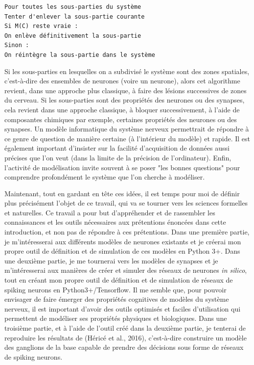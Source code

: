 \documentclass[12pt]{scrartcl}
\begin{document}
\begin{enumerate}
\begin{verbatim}
Pour toutes les sous-parties du système 
Tenter d'enlever la sous-partie courante 
Si M(C) reste vraie : 
On enlève définitivement la sous-partie 
Sinon : 
On réintègre la sous-partie dans le système
\end{verbatim}
Si les sous-parties en lesquelles on a subdivisé le système sont des zones spatiales, c'est-à-dire des ensembles de neurones (voire un neurone), alors cet algorithme revient, dans une approche plus classique, à faire des lésions successives de zones du cerveau. Si les sous-parties sont des propriétés des neurones ou des synapses, cela revient dans une approche classique, à bloquer successivement, à l'aide de composantes chimiques par exemple, certaines propriétés des neurones ou des synapses. 
Un modèle informatique du système nerveux permettrait de répondre à ce genre de question de manière certaine (à l'intérieur du modèle) et rapide. Il est également important d'insister sur la facilité d'acquisition de données aussi précises que l'on veut (dans la limite de la précision de l'ordinateur). Enfin, l'activité de modélisation invite souvent à se poser "les bonnes questions" pour comprendre profondément le système que l'on cherche à modéliser. \\ \end{enumerate}

Maintenant, tout en gardant en tête ces idées, il est temps pour moi de définir plus précisément l'objet de ce travail, qui va se tourner vers les sciences formelles et naturelles. Ce travail a pour but d'appréhender et de rassembler les connaissances et les outils nécessaires aux prétentions énoncées dans cette introduction, et non pas de répondre à ces prétentions. 
Dans une première partie, je m'intéresserai aux différents modèles de neurones existants et je créerai mon propre outil de définition et de simulation de ces modèles en Python 3+. Dans une deuxième partie, je me tournerai vers les modèles de synapses et je m'intéresserai aux manières de créer et simuler des réseaux de neurones \textit{in silico}, tout en créant mon propre outil de définition et de simulation de réseaux de spiking neurons en Python3+/Tensorflow. Il me semble que, pour pouvoir envisager de faire émerger des propriétés cognitives de modèles du système nerveux, il est important d'avoir des outils optimisés et faciles d'utilisation qui permettent de modéliser ses propriétés physiques et biologiques. Dans une troisième partie, et à l'aide de l'outil créé dans la deuxième partie, je tenterai de reproduire les résultats de (Héricé et al., 2016), c'est-à-dire construire un modèle des ganglions de la base capable de prendre des décisions sous forme de réseaux de spiking neurons.
\pagebreak
\end{document}
